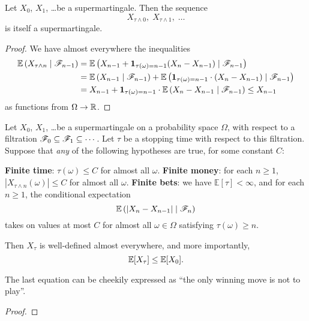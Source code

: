 \begin{proposition}
	Let $X_0$, $X_1$, \dots be a supermartingale.
	Then the sequence
	\[ X_{\tau \wedge 0}, \; X_{\tau \wedge 1}, \; \dots \]
	is itself a supermartingale.
\end{proposition}
\begin{proof}
	We have almost everywhere the inequalities
	\begin{align*}
		\mathbb E\left( X_{\tau \wedge n} \mid \mathscr F_{n-1} \right)
		&= \mathbb E \left( X_{n-1} + \mathbf 1_{\tau(\omega) = n-1} (X_n - X_{n-1}) \mid \mathscr F_{n-1} \right) \\
		&= \mathbb E \left( X_{n-1} \mid \mathscr F_{n-1} \right)
		+ \mathbb E \left( \mathbf 1_{\tau(\omega) = n-1} \cdot (X_n - X_{n-1}) \mid \mathscr F_{n-1} \right) \\
		&= X_{n-1} + \mathbf 1_{\tau(\omega) = n-1}
			\cdot\mathbb E \left(  X_n - X_{n-1} \mid \mathscr F_{n-1} \right)
		\le X_{n-1}
	\end{align*}
	as functions from $\Omega \to \mathbb R$.
\end{proof}

\begin{theorem}
	Let $X_0$, $X_1$, \dots be a supermartingale on a probability space $\Omega$,
	with respect to a filtration $\mathscr F_0 \subseteq \mathscr F_1 \subseteq \cdots$.
	Let $\tau$ be a stopping time with respect to this filtration.
	Suppose that \emph{any} of the following hypotheses are true,
	for some constant $C$:
	\begin{enumerate}[(a)]
		\ii \textbf{Finite time}: $\tau(\omega) \le C$ for almost all $\omega$.
		\ii \textbf{Finite money}: for each $n \ge 1$,
		$\left\lvert X_{\tau \wedge n}(\omega) \right\rvert \le C$
		for almost all $\omega$.
		\ii \textbf{Finite bets}: we have $\mathbb E[\tau] < \infty$,
		and for each $n \ge 1$, the conditional expectation
		\[ \mathbb E\left( \left\lvert X_n-X_{n-1} \right\rvert
			\mid \mathscr F_n \right) \]
		takes on values at most $C$ for almost all $\omega \in \Omega$
		satisfying $\tau(\omega) \ge n$.
	\end{enumerate}
	Then $X_\tau$ is well-defined almost everywhere,
	and more importantly, \[ \mathbb E[X_\tau] \le \mathbb E[X_0]. \]
\end{theorem}
The last equation can be cheekily expressed as
``the only winning move is not to play''.

\begin{proof}
\end{proof}

